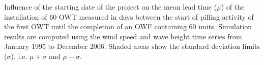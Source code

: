\label{fig:timeseriesmodel}
Influence of the starting date of the project on the mean lead time ($\mu$) of the installation of 60 OWT measured in days between the start of pilling activity of the first OWT until the completion of an OWF containing 60 units. Simulation results are computed using the wind speed and wave height time series from January 1995 to December 2006. Shaded areas show the standard deviation limits ($\sigma$), i.e. $\mu + \sigma$ and $\mu - \sigma$. 